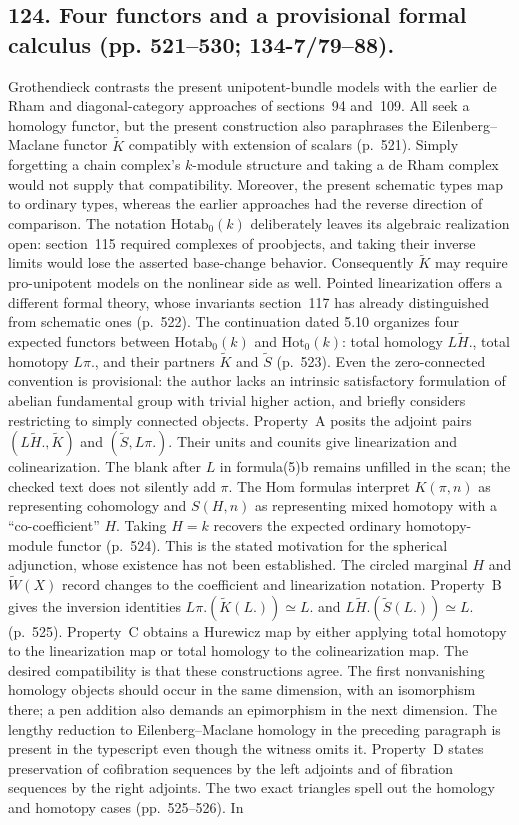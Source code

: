 \documentclass[10pt,oneside]{book}
\begin{document}
\subsection*{124. Four functors and a provisional formal calculus (pp. 521--530; 134-7/79--88).}
Grothendieck contrasts the present unipotent-bundle models with the earlier de Rham and diagonal-category approaches of sections~94 and~109. All seek a homology functor, but the present construction also paraphrases the Eilenberg--Maclane functor $\widetilde K$ compatibly with extension of scalars (p.~521). Simply forgetting a chain complex's $k$-module structure and taking a de Rham complex would not supply that compatibility. Moreover, the present schematic types map to ordinary types, whereas the earlier approaches had the reverse direction of comparison. The notation $\mathrm{Hotab}_0(k)$ deliberately leaves its algebraic realization open: section~115 required complexes of proobjects, and taking their inverse limits would lose the asserted base-change behavior. Consequently $\widetilde K$ may require pro-unipotent models on the nonlinear side as well. Pointed linearization offers a different formal theory, whose invariants section~117 has already distinguished from schematic ones (p.~522). The continuation dated 5.10 organizes four expected functors between $\mathrm{Hotab}_0(k)$ and $\mathrm{Hot}_0(k)$: total homology $L\widetilde H.$, total homotopy $L\pi.$, and their partners $\widetilde K$ and $\widetilde S$ (p.~523). Even the zero-connected convention is provisional: the author lacks an intrinsic satisfactory formulation of abelian fundamental group with trivial higher action, and briefly considers restricting to simply connected objects. Property~A posits the adjoint pairs $(L\widetilde H.,\widetilde K)$ and $(\widetilde S,L\pi.)$. Their units and counits give linearization and colinearization. The blank after $L$ in formula(5)b remains unfilled in the scan; the checked text does not silently add $\pi$. The Hom formulas interpret $K(\pi,n)$ as representing cohomology and $S(H,n)$ as representing mixed homotopy with a ``co-coefficient'' $H$. Taking $H=k$ recovers the expected ordinary homotopy-module functor (p.~524). This is the stated motivation for the spherical adjunction, whose existence has not been established. The circled marginal $H$ and $\widetilde W(X)$ record changes to the coefficient and linearization notation. Property~B gives the inversion identities $L\pi.(\widetilde K(L.))\simeq L.$ and $L\widetilde H.(\widetilde S(L.))\simeq L.$ (p.~525). Property~C obtains a Hurewicz map by either applying total homotopy to the linearization map or total homology to the colinearization map. The desired compatibility is that these constructions agree. The first nonvanishing homology objects should occur in the same dimension, with an isomorphism there; a pen addition also demands an epimorphism in the next dimension. The lengthy reduction to Eilenberg--Maclane homology in the preceding paragraph is present in the typescript even though the witness omits it. Property~D states preservation of cofibration sequences by the left adjoints and of fibration sequences by the right adjoints. The two exact triangles spell out the homology and homotopy cases (pp.~525--526). In 
\end{document}
